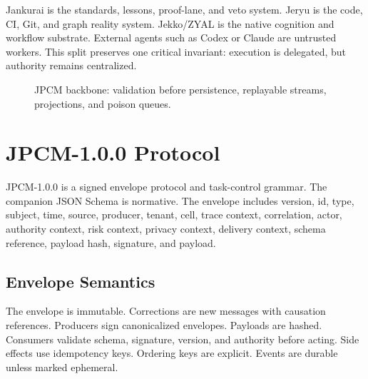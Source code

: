 \documentclass[10pt,journal,onecolumn]{IEEEtran}
\begin{document}
Jankurai is the standards, lessons, proof-lane, and veto system. Jeryu is the code, CI, Git, and graph reality system. Jekko/ZYAL is the native cognition and workflow substrate. External agents such as Codex or Claude are untrusted workers. This split preserves one critical invariant: execution is delegated, but authority remains centralized.


\begin{figure}[t]
\centering
{}
\caption{JPCM backbone: validation before persistence, replayable streams, projections, and poison queues.}
\label{fig:backbone}
\end{figure}

\section{JPCM-1.0.0 Protocol}
JPCM-1.0.0 is a signed envelope protocol and task-control grammar. The companion JSON Schema is normative. The envelope includes version, id, type, subject, time, source, producer, tenant, cell, trace context, correlation, actor, authority context, risk context, privacy context, delivery context, schema reference, payload hash, signature, and payload.

\subsection{Envelope Semantics}
The envelope is immutable. Corrections are new messages with causation references. Producers sign canonicalized envelopes. Payloads are hashed. Consumers validate schema, signature, version, and authority before acting. Side effects use idempotency keys. Ordering keys are explicit. Events are durable unless marked ephemeral.
\end{document}
